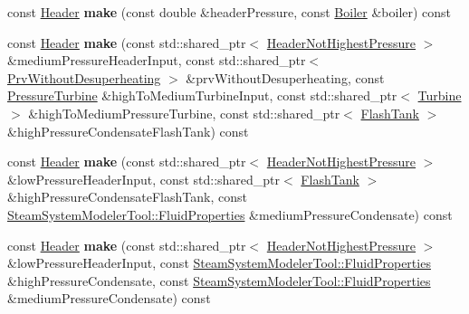 \begin{DoxyCompactItemize}
\item 
\mbox{\label{class_header_factory_ab7968fee2aa5304d4b0d1a606c951671}} 
const \hyperlink{class_header}{Header} {\bfseries make} (const double \&header\+Pressure, const \hyperlink{class_boiler}{Boiler} \&boiler) const
\item 
\mbox{\label{class_header_factory_a0a96f7d058915a2fa5da60d1d692e9c9}} 
const \hyperlink{class_header}{Header} {\bfseries make} (const std\+::shared\+\_\+ptr$<$ \hyperlink{class_header_not_highest_pressure}{Header\+Not\+Highest\+Pressure} $>$ \&medium\+Pressure\+Header\+Input, const std\+::shared\+\_\+ptr$<$ \hyperlink{class_prv_without_desuperheating}{Prv\+Without\+Desuperheating} $>$ \&prv\+Without\+Desuperheating, const \hyperlink{class_pressure_turbine}{Pressure\+Turbine} \&high\+To\+Medium\+Turbine\+Input, const std\+::shared\+\_\+ptr$<$ \hyperlink{class_turbine}{Turbine} $>$ \&high\+To\+Medium\+Pressure\+Turbine, const std\+::shared\+\_\+ptr$<$ \hyperlink{class_flash_tank}{Flash\+Tank} $>$ \&high\+Pressure\+Condensate\+Flash\+Tank) const
\item 
\mbox{\label{class_header_factory_a7c1816cf897aed67139457dccd6b25d9}} 
const \hyperlink{class_header}{Header} {\bfseries make} (const std\+::shared\+\_\+ptr$<$ \hyperlink{class_header_not_highest_pressure}{Header\+Not\+Highest\+Pressure} $>$ \&low\+Pressure\+Header\+Input, const std\+::shared\+\_\+ptr$<$ \hyperlink{class_flash_tank}{Flash\+Tank} $>$ \&high\+Pressure\+Condensate\+Flash\+Tank, const \hyperlink{struct_steam_system_modeler_tool_1_1_fluid_properties}{Steam\+System\+Modeler\+Tool\+::\+Fluid\+Properties} \&medium\+Pressure\+Condensate) const
\item 
\mbox{\label{class_header_factory_a4de4da6bbf02a25cc1ff78a9f1c7fbe0}} 
const \hyperlink{class_header}{Header} {\bfseries make} (const std\+::shared\+\_\+ptr$<$ \hyperlink{class_header_not_highest_pressure}{Header\+Not\+Highest\+Pressure} $>$ \&low\+Pressure\+Header\+Input, const \hyperlink{struct_steam_system_modeler_tool_1_1_fluid_properties}{Steam\+System\+Modeler\+Tool\+::\+Fluid\+Properties} \&high\+Pressure\+Condensate, const \hyperlink{struct_steam_system_modeler_tool_1_1_fluid_properties}{Steam\+System\+Modeler\+Tool\+::\+Fluid\+Properties} \&medium\+Pressure\+Condensate) const
\item 

\end{DoxyCompactItemize}
